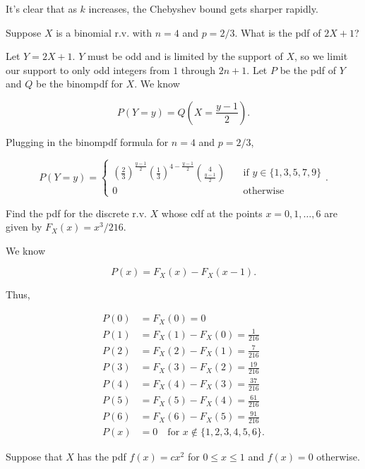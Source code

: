 \documentclass[answers]{exam}
\begin{document}
\begin{questions}
\begin{solution}
It's clear that as $k$ increases, the Chebyshev bound gets sharper rapidly.
\end{solution}

\question[10] Suppose $X$ is a binomial r.v. with $n=4$ and $p=2 / 3$. What is
the pdf of $2X + 1$?

\begin{solution}
Let $Y = 2X + 1$. $Y$ must be odd and is limited by the support of $X$, so we limit 
our support to only odd integers from $1$ through $2n + 1$. Let $P$ be the pdf
of $Y$ and $Q$ be the binompdf for $X$. We know 

\[
P(Y = y) = Q(X = \frac{y-1}{2})
.\] 

Plugging in the binompdf formula for $n=4$ and $p=2 / 3$,  

\[
P(Y = y) = \begin{cases}
(\frac{2}{3})^{\frac{y-1}{2}}\left( \frac{1}{3} \right)^{4-\frac{y-1}{2}}
\binom{4}{\frac{y-1}{2}} &\quad \text{if } y \in \{1,3,5,7,9\} \\ 
0 &\quad \text{otherwise}
\end{cases}
.\] 
\end{solution}

\question[10] Find the pdf for the discrete r.v. $X$ whose cdf at the points
$x=0,1,\ldots,6$ are given by $F_{X}(x) = x^3 / 216$.

\begin{solution}
We know 

\[
P(x) = F_{X}(x) - F_{X}(x - 1)
.\] 

Thus,

\begin{align*}
    P(0) &= F_{X}(0) = 0 \\ 
    P(1) &= F_{X}(1) - F_{X}(0) = \frac{1}{216} \\
    P(2) &= F_{X}(2) - F_{X}(1) = \frac{7}{216} \\
    P(3) &= F_{X}(3) - F_{X}(2) = \frac{19}{216} \\
    P(4) &= F_{X}(4) - F_{X}(3) = \frac{37}{216} \\
    P(5) &= F_{X}(5) - F_{X}(4) = \frac{61}{216} \\
    P(6) &= F_{X}(6) - F_{X}(5) = \frac{91}{216} \\ 
    P(x) &= 0 \quad \text{for } x \not\in \{1,2,3,4,5,6\}
.\end{align*}
\end{solution}

\question[15] Suppose that $X$ has the pdf $f(x)=cx^2$ for $0\le x\le 1$ and
$f(x) = 0$ otherwise.


\end{questions}
\end{document}
